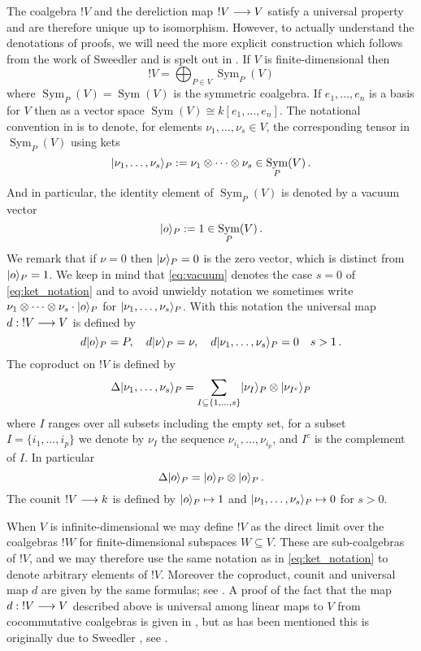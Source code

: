 \documentclass[english,letter paper,12pt,reqno]{article}
\DeclarePairedDelimiter\ket{\lvert}{\rangle}
\theoremstyle{example}
\numberwithin{equation}{section}
\DeclareMathOperator{\Sym}{Sym}
\begin{document}
The coalgebra ${!} V$ and the dereliction map ${!} V \longrightarrow V$ satisfy a universal property and are therefore unique up to isomorphism. However, to actually understand the denotations of proofs, we will need the more explicit construction which follows from the work of Sweedler \cite{sweedler} and is spelt out in \cite{murfet_coalg}. If $V$ is finite-dimensional then
\begin{equation}\label{eq:presentation_intro}
{!} V = \bigoplus_{P \in V} \Sym_P(V)
\end{equation}
where $\Sym_P(V) = \Sym(V)$ is the symmetric coalgebra. If $e_1,\ldots,e_n$ is a basis for $V$ then as a vector space $\Sym(V) \cong k[e_1,\ldots,e_n]$. The notational convention in \cite{murfet_coalg} is to denote, for elements $\nu_1,\ldots,\nu_s \in V$, the corresponding tensor in $\Sym_P(V)$ using kets
\begin{equation}\label{eq:ket_notation}
\ket{\nu_1,\ldots,\nu_s}_P := \nu_1 \otimes \cdots \otimes \nu_s \in \Sym_P(V)\,.
\end{equation}
And in particular, the identity element of $\Sym_P(V)$ is denoted by a vacuum vector
\begin{equation}\label{eq:vacuum}
\ket{o}_P := 1 \in \Sym_P(V)\,.
\end{equation}
We remark that if $\nu = 0$ then $\ket{\nu}_P = 0$ is the zero vector, which is distinct from $\ket{o}_P = 1$. We keep in mind that \eqref{eq:vacuum} denotes the case $s = 0$ of \eqref{eq:ket_notation} and to avoid unwieldy notation we sometimes write $\nu_1 \otimes \cdots \otimes \nu_s \cdot \ket{o}_P$ for $\ket{\nu_1,\ldots,\nu_s}_P$. With this notation the universal map $d: {!} V \longrightarrow V$ is defined by
\[
d \ket{o}_P = P, \quad d\ket{\nu}_P = \nu, \quad d\ket{\nu_1,\ldots,\nu_s}_P = 0 \quad s > 1\,.
\]
The coproduct on ${!} V$ is defined by
\begin{equation}\label{eq:lc_coalgebra_1}
\Delta \ket{ \nu_1, \ldots, \nu_s }_P = \sum_{I \subseteq \{ 1, \ldots, s \}} \ket{ \nu_I }_P \otimes \ket{ \nu_{I^c} }_P
\end{equation}
where $I$ ranges over all subsets including the empty set, for a subset $I = \{ i_1, \ldots, i_p \}$ we denote by $\nu_I$ the sequence $\nu_{i_1},\ldots,\nu_{i_p}$, and $I^c$ is the complement of $I$. In particular
\[
\Delta \ket{o}_P = \ket{o}_P \otimes \ket{o}_P\,.
\]
The counit ${!} V \longrightarrow k$ is defined by $\ket{o}_P \mapsto 1$ and $\ket{\nu_1,\ldots,\nu_s}_P \mapsto 0$ for $s > 0$.

When $V$ is infinite-dimensional we may define ${!} V$ as the direct limit over the coalgebras ${!} W$ for finite-dimensional subspaces $W \subseteq V$. These are sub-coalgebras of ${!} V$, and we may therefore use the same notation as in \eqref{eq:ket_notation} to denote arbitrary elements of ${!} V$. Moreover the coproduct, counit and universal map $d$ are given by the same formulas; see \cite[\S 2.1]{murfet_coalg}. A proof of the fact that the map $d: {!} V \longrightarrow V$ described above is universal among linear maps to $V$ from cocommutative coalgebras is given in \cite[Theorem 2.18]{murfet_coalg}, but as has been mentioned this is originally due to Sweedler \cite{sweedler}, see \cite[Appendix B]{murfet_coalg}.
\end{document}
